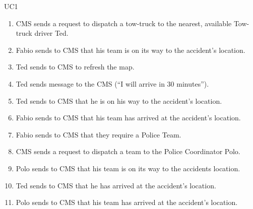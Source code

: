 \begin{lyxlist}{UC1}
{\begin{enumerate}
  Coordinator Fabio.
  \item CMS sends a request to dispatch a tow-truck to the nearest, available
  Tow-truck driver Ted.
  \item Fabio sends to CMS that his team is on its way to the accident’s
  location.
  \item Ted sends to CMS to refresh the map.
  \item Ted sends message to the CMS (``I will arrive in 30 minutes'').
  \item Ted sends to CMS that he is on his way to the accident’s location.
  \item Fabio sends to CMS that his team has arrived at the accident’s
  location.
  \item Fabio sends to CMS that they require a Police Team.
  \item CMS sends a request to dispatch a team to the Police Coordinator Polo.
  \item Polo sends to CMS that his team is on its way to the accidents
  location.
  \item Ted sends to CMS that he has arrived at the accident’s location.
  \item Polo sends to CMS that his team has arrived at the accident’s
  location.
\end{enumerate}
}  
\end{lyxlist}

